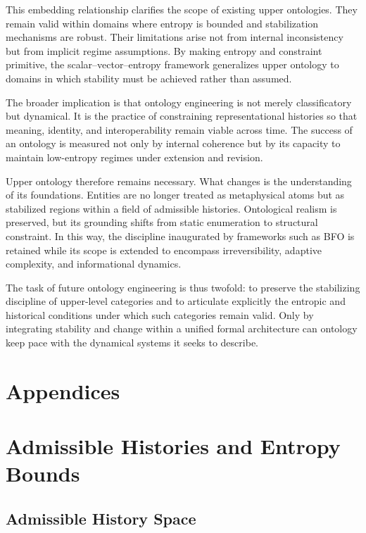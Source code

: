 \documentclass[12pt]{article}
\begin{document}
This embedding relationship clarifies the scope of existing upper ontologies. They remain valid within domains where entropy is bounded and stabilization mechanisms are robust. Their limitations arise not from internal inconsistency but from implicit regime assumptions. By making entropy and constraint primitive, the scalar–vector–entropy framework generalizes upper ontology to domains in which stability must be achieved rather than assumed.

The broader implication is that ontology engineering is not merely classificatory but dynamical. It is the practice of constraining representational histories so that meaning, identity, and interoperability remain viable across time. The success of an ontology is measured not only by internal coherence but by its capacity to maintain low-entropy regimes under extension and revision.

Upper ontology therefore remains necessary. What changes is the understanding of its foundations. Entities are no longer treated as metaphysical atoms but as stabilized regions within a field of admissible histories. Ontological realism is preserved, but its grounding shifts from static enumeration to structural constraint. In this way, the discipline inaugurated by frameworks such as BFO is retained while its scope is extended to encompass irreversibility, adaptive complexity, and informational dynamics.

The task of future ontology engineering is thus twofold: to preserve the stabilizing discipline of upper-level categories and to articulate explicitly the entropic and historical conditions under which such categories remain valid. Only by integrating stability and change within a unified formal architecture can ontology keep pace with the dynamical systems it seeks to describe.


\newpage
\section*{Appendices}
\appendix

\section{Admissible Histories and Entropy Bounds}

\subsection{Admissible History Space}
\end{document}
